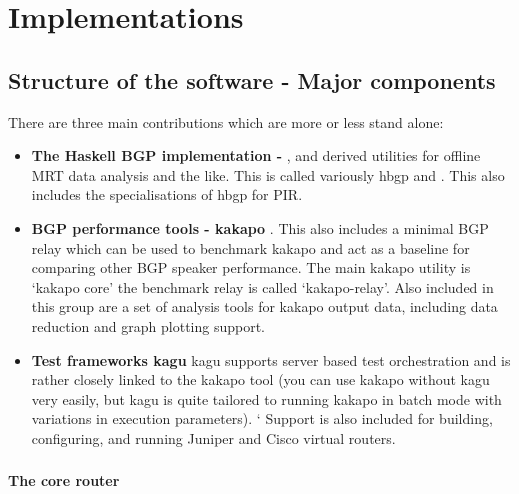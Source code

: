 \chapter{Implementations}

\section{Structure of the software - Major components}

There are three main contributions which are more or less stand alone:
\begin{itemize}
    \item \textbf{The Haskell BGP implementation - \hbgp}, and derived utilities for offline MRT data analysis and the like.  This is called variously hbgp and \hbgp.  This also includes the specialisations of hbgp for PIR.
    \item \textbf{BGP performance tools - kakapo }.  This also includes a minimal BGP relay which can be used to benchmark kakapo and act as a baseline for comparing other BGP speaker performance.  The main kakapo utility is ‘kakapo core’ \- the benchmark relay is called ‘kakapo-relay’.  Also included in this group are a set of analysis tools for kakapo output data, including data reduction and graph plotting support.
    \item \textbf{Test frameworks \- kagu}  \- kagu supports server based test orchestration and is rather closely linked to the kakapo tool (you can use kakapo without kagu very easily, but kagu is quite tailored to running kakapo in batch mode with variations in execution parameters). `
    Support is also included for building, configuring, and running Juniper and Cisco virtual routers.
\end{itemize}

\subsection{\hbgp}

\subsubsection*{The \hbgp core router}

